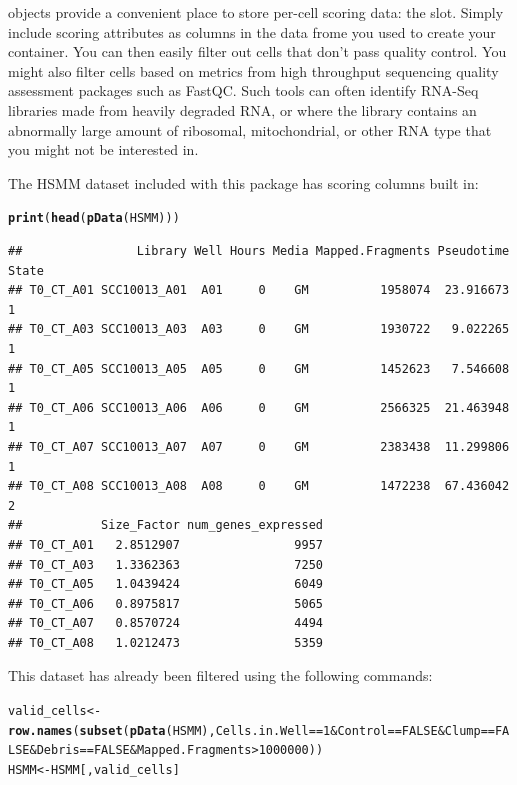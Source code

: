 \documentclass[10pt,oneside]{article}\usepackage[]{graphicx}\usepackage[]{color}
\makeatletter
\newcommand{\hlnum}[1]{\textcolor[rgb]{0.686,0.059,0.569}{#1}}%
\newcommand{\hlopt}[1]{\textcolor[rgb]{0,0,0}{#1}}%
\newcommand{\hlstd}[1]{\textcolor[rgb]{0.345,0.345,0.345}{#1}}%
\newcommand{\hlkwb}[1]{\textcolor[rgb]{0.69,0.353,0.396}{#1}}%
\newcommand{\hlkwd}[1]{\textcolor[rgb]{0.737,0.353,0.396}{\textbf{#1}}}%
\newenvironment{kframe}{%
 \def\at@end@of@kframe{}%
 \ifinner\ifhmode%
  \def\at@end@of@kframe{\end{minipage}}%
  \begin{minipage}{\columnwidth}%
 \fi\fi%
 \def\FrameCommand##1{\hskip\@totalleftmargin \hskip-\fboxsep
 \colorbox{shadecolor}{##1}\hskip-\fboxsep
     \hskip-\linewidth \hskip-\@totalleftmargin \hskip\columnwidth}%
 \MakeFramed {\advance\hsize-\width
   \@totalleftmargin\z@ \linewidth\hsize
   \@setminipage}}%
 {\par\unskip\endMakeFramed%
 \at@end@of@kframe}
\newenvironment{knitrout}{}{} %
\makeatother
\begin{document}
 objects provide a convenient place to store per-cell scoring data: the  slot.  Simply include scoring attributes as columns in the data frome you used to create your  container.  You can then easily filter out cells that don't pass quality control. You might also filter cells based on metrics from high throughput sequencing quality assessment packages such as FastQC. Such tools can often identify RNA-Seq libraries made from heavily degraded RNA, or where the library contains an abnormally large amount of ribosomal, mitochondrial, or other RNA type that you might not be interested in.

The HSMM dataset included with this package has scoring columns built in: 
\begin{knitrout}
\color{fgcolor}\begin{kframe}
\begin{alltt}
\hlkwd{print}\hlstd{(}\hlkwd{head}\hlstd{(}\hlkwd{pData}\hlstd{(HSMM)))}
\end{alltt}
\begin{verbatim}
##                Library Well Hours Media Mapped.Fragments Pseudotime State
## T0_CT_A01 SCC10013_A01  A01     0    GM          1958074  23.916673     1
## T0_CT_A03 SCC10013_A03  A03     0    GM          1930722   9.022265     1
## T0_CT_A05 SCC10013_A05  A05     0    GM          1452623   7.546608     1
## T0_CT_A06 SCC10013_A06  A06     0    GM          2566325  21.463948     1
## T0_CT_A07 SCC10013_A07  A07     0    GM          2383438  11.299806     1
## T0_CT_A08 SCC10013_A08  A08     0    GM          1472238  67.436042     2
##           Size_Factor num_genes_expressed
## T0_CT_A01   2.8512907                9957
## T0_CT_A03   1.3362363                7250
## T0_CT_A05   1.0439424                6049
## T0_CT_A06   0.8975817                5065
## T0_CT_A07   0.8570724                4494
## T0_CT_A08   1.0212473                5359
\end{verbatim}
\end{kframe}
\end{knitrout}

This dataset has already been filtered using the following commands: 

\begin{knitrout}
\color{fgcolor}\begin{kframe}
\begin{alltt}
\hlstd{valid_cells} \hlkwb{<-} \hlkwd{row.names}\hlstd{(}\hlkwd{subset}\hlstd{(}\hlkwd{pData}\hlstd{(HSMM), Cells.in.Well} \hlopt{==} \hlnum{1} \hlopt{&} \hlstd{Control} \hlopt{==} \hlnum{FALSE} \hlopt{&} \hlstd{Clump} \hlopt{==} \hlnum{FALSE} \hlopt{&} \hlstd{Debris} \hlopt{==} \hlnum{FALSE} \hlopt{&} \hlstd{Mapped.Fragments} \hlopt{>} \hlnum{1000000}\hlstd{))}
\hlstd{HSMM} \hlkwb{<-} \hlstd{HSMM[,valid_cells]}
\end{alltt}
\end{kframe}
\end{knitrout}
\end{document}
